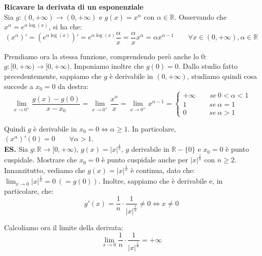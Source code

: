 \documentclass{article}
\begin{document}
\noindent\textbf{Ricavare la derivata di un esponenziale}\\
Sia $g: (0, +\infty) \xrightarrow{} (0, +\infty)$ e $g(x) = x^\alpha$ con $\alpha \in \mathbb{R}$. Osservando che $x^\alpha = e^{\alpha\log(x)}$, si ha che:
\begin{equation*}
    (x^\alpha)' = (e^{\alpha\log(x)})' = e^{\alpha\log(x)} \frac{\alpha}{x} = \frac{\alpha}{x} x^\alpha = \alpha x^{\alpha - 1} \qquad \forall x \in (0, +\infty), \alpha \in \mathbb{R}
\end{equation*}

\noindent Prendiamo ora la stessa funzione, comprendendo però anche lo $0$: $g: [0, +\infty) \xrightarrow{} [0, +\infty)$. Imponiamo inoltre che $g(0) = 0$. Dallo studio fatto precedentemente, sappiamo che $g$ è derivabile in $(0, +\infty)$, studiamo quindi cosa succede a $x_0 = 0$ da destra:
\begin{equation*}
    \lim_{x \to 0^+} \frac{g(x) - g(0)}{x - x_0} = \lim_{x \to 0^+} \frac{x^\alpha}{x} = \lim_{x \to 0^+} x^{\alpha - 1} = \begin{cases}
        +\infty \qquad se \ 0 < \alpha < 1\\
        1 \qquad \quad \ se \ \alpha = 1\\
        0 \qquad \quad \ se \ \alpha > 1
    \end{cases}
\end{equation*}

\noindent Quindi $g$ è derivabile in $x_0 = 0 \iff \alpha \geq 1$. In particolare, $(x^\alpha)'(0) = 0 \qquad \forall \alpha > 1$.\\

\noindent\textbf{ES.} Sia $g: \mathbb{R} \xrightarrow{} [0, +\infty)$, $g(x) = |x|^\frac{1}{2}$, $g$ derivabile in $\mathbb{R} - \{0\}$ e $x_0 = 0$ è punto cuspidale. Mostrare che $x_0 = 0$ è punto cuspidale anche per $|x|^\frac{1}{n}$ con $n \geq 2$.\\
Innanzitutto, vediamo che $g(x) = |x|^\frac{1}{n}$ è continua, dato che: $\lim_{x \to 0} |x|^\frac{1}{n} = 0 \ (= g(0))$. Inoltre, sappiamo che è derivabile e, in particolare, che:
\begin{equation*}
    g'(x) = \frac{1}{n} \cdot \frac{1}{|x|^\frac{1}{n}} \neq 0 \iff x \neq 0
\end{equation*}

\noindent Calcoliamo ora il limite della derivata:
\begin{equation*}
    \lim_{x \to 0} \frac{1}{n} \cdot \frac{1}{|x|^\frac{1}{n}} = + \infty
\end{equation*}
\end{document}
